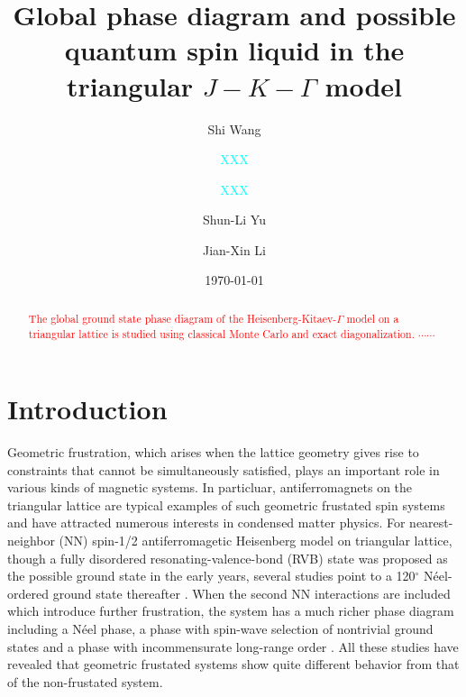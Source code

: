 \documentclass[aps,prb,reprint,amsfonts,amsmath,amssymb,showpacs,groupedaddress,superscriptaddress]{revtex4-1}
\begin{document}
\title{Global phase diagram and possible quantum spin liquid in the triangular $J-K-\Gamma$ model}

\author{Shi Wang}

\author{\textcolor{cyan}{XXX}}
\affiliation{\textcolor{cyan}{XXX}}

\author{\textcolor{cyan}{XXX}}
\affiliation{\textcolor{cyan}{XXX}}

\author{Shun-Li Yu}

\author{Jian-Xin Li}

\date{\today}

\begin{abstract}
\textcolor{red}{The global ground state phase diagram of the Heisenberg-Kitaev-$\Gamma$ model on a triangular lattice is studied using classical Monte Carlo and exact diagonalization. $\cdots \cdots$}
\end{abstract}

\maketitle

\section{\label{sec:SectionI}Introduction}
Geometric frustration, which arises when the lattice geometry gives rise to constraints that cannot be simultaneously satisfied, plays an important role in various kinds of magnetic systems. In particluar, antiferromagnets on the triangular lattice are typical examples of such geometric frustated spin systems and have attracted numerous interests in condensed matter physics. For nearest-neighbor (NN) spin-1/2 antiferromagetic Heisenberg model on triangular lattice, though a fully disordered resonating-valence-bond (RVB) \cite{Anderson1973} state was proposed as the possible ground state in the early years, several studies point to a 120$^\circ$ N\'{e}el-ordered ground state thereafter \cite{PhysRevLett.99.127004,PhysRevLett.82.3899,PhysRevB.50.10048,PhysRevLett.60.2531}. When the second NN interactions are included which introduce further frustration, the system has a much richer phase diagram including a N\'{e}el phase, a phase with spin-wave selection of nontrivial ground states and a phase with incommensurate long-range order \cite{PhysRevB.42.4800,PhysRevB.46.11137}. All these studies have revealed that geometric frustated systems show quite different behavior from that of the non-frustated system.
\end{document}
